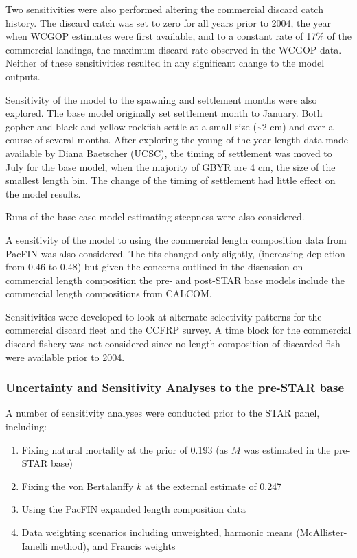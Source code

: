 \documentclass[12pt,]{article}
\begin{document}
Two sensitivities were also performed altering the commercial discard
catch history. The discard catch was set to zero for all years prior to
2004, the year when WCGOP estimates were first available, and to a
constant rate of 17\% of the commercial landings, the maximum discard
rate observed in the WCGOP data. Neither of these sensitivities resulted
in any significant change to the model outputs.

Sensitivity of the model to the spawning and settlement months were also
explored. The base model originally set settlement month to January.
Both gopher and black-and-yellow rockfish settle at a small size
(\textasciitilde{}2 cm) and over a course of several months. After
exploring the young-of-the-year length data made available by Diana
Baetscher (UCSC), the timing of settlement was moved to July for the
base model, when the majority of GBYR are 4 cm, the size of the smallest
length bin. The change of the timing of settlement had little effect on
the model results.

Runs of the base case model estimating steepness were also considered.

A sensitivity of the model to using the commercial length composition
data from PacFIN was also considered. The fits changed only slightly,
(increasing depletion from 0.46 to 0.48) but given the concerns outlined
in the discussion on commercial length composition the pre- and
post-STAR base models include the commercial length compositions from
CALCOM.

Sensitivities were developed to look at alternate selectivity patterns
for the commercial discard fleet and the CCFRP survey. A time block for
the commercial discard fishery was not considered since no length
composition of discarded fish were available prior to 2004.

\subsubsection{Uncertainty and Sensitivity Analyses to the pre-STAR
base}\label{uncertainty-and-sensitivity-analyses-to-the-pre-star-base}

A number of sensitivity analyses were conducted prior to the STAR panel,
including:

\begin{enumerate}

  \item Fixing natural mortality at the prior of 0.193 (as $M$ was estimated in the pre-STAR base)
  
  \item Fixing the von Bertalanffy $k$ at the external estimate of 0.247
  
  \item Using the PacFIN expanded length composition data
  
  \item Data weighting scenarios including unweighted, harmonic means (McAllister-Ianelli method), and Francis weights

\end{enumerate}
\end{document}
